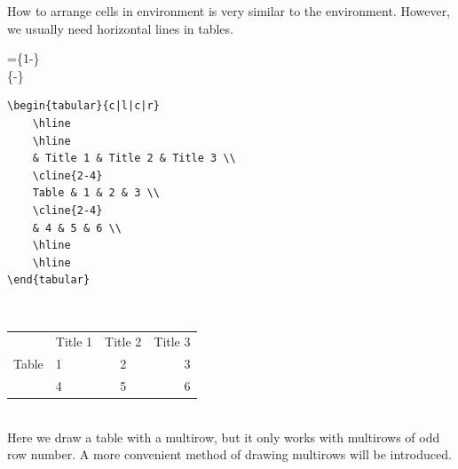 \begin{frame}[fragile]
	How to arrange cells in  environment is very similar to the  environment. However, we usually need horizontal lines in tables.
	\begin{command}
		\quad=\quad{}\{1-\}\\
		\{-\}
	\end{command}
	\begin{minipage}{0.45\linewidth}
		\begin{example}
			\begin{verbatim}
\begin{tabular}{c|l|c|r}
    \hline
    \hline
    & Title 1 & Title 2 & Title 3 \\
    \cline{2-4}
    Table & 1 & 2 & 3 \\
    \cline{2-4}
    & 4 & 5 & 6 \\
    \hline
    \hline
\end{tabular}
			\end{verbatim}		
    	\end{example}
	\end{minipage}
	\hfill
    \begin{minipage}{0.5\linewidth}
    	\ \\[0.5em]
    	\begin{tabular}{c|l|c|r}
        	\hline\hline
        	& Title 1 & Title 2 & Title 3 \\
        	\cline{2-4}
        	Table & 1 & 2 & 3 \\
        	\cline{2-4}
        	& 4 & 5 & 6 \\
        	\hline\hline
        \end{tabular}\\[0.5em]
        Here we draw a table with a multirow, but it only works with multirows of odd row number. A more convenient method of drawing multirows will be introduced.
    \end{minipage}
    
\end{frame}

